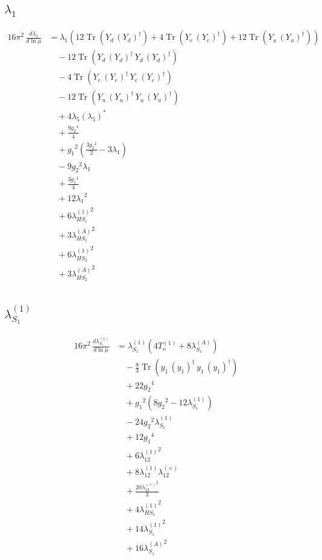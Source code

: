 \documentclass[10pt,a4paper]{article}
\begin{document}
\subsection*{$\lambda_1$}
\begin{align*}
16\pi^2\,\frac{d \lambda_1}{d\ln\mu} &={\lambda_1} (12 \operatorname{Tr}\!\left({Y_d}\,\left({Y_d}\right)^{\dagger}\right)+4 \operatorname{Tr}\!\left({Y_e}\,\left({Y_e}\right)^{\dagger}\right)+12 \operatorname{Tr}\!\left({Y_u}\,\left({Y_u}\right)^{\dagger}\right)) \\
&\quad -12 \operatorname{Tr}\!\left({Y_d}\,\left({Y_d}\right)^{\dagger}\,{Y_d}\,\left({Y_d}\right)^{\dagger}\right) \\
&\quad -4 \operatorname{Tr}\!\left({Y_e}\,\left({Y_e}\right)^{\dagger}\,{Y_e}\,\left({Y_e}\right)^{\dagger}\right) \\
&\quad -12 \operatorname{Tr}\!\left({Y_u}\,\left({Y_u}\right)^{\dagger}\,{Y_u}\,\left({Y_u}\right)^{\dagger}\right) \\
&\quad +4 {\lambda_5} \left({\lambda_5}\right)^{*} \\
&\quad +\frac{9 {g_2}^4}{4} \\
&\quad +{g_1}^2 \left(\frac{3 {g_2}^2}{2}-3 {\lambda_1}\right) \\
&\quad -9 {g_2}^2 {\lambda_1} \\
&\quad +\frac{3 {g_1}^4}{4} \\
&\quad +12 {\lambda_1}^2 \\
&\quad +6 {\lambda_{HS_1}^{(1)}}^2 \\
&\quad +3 {\lambda_{HS_1}^{(A)}}^2 \\
&\quad +6 {\lambda_{HS_2}^{(1)}}^2 \\
&\quad +3 {\lambda_{HS_2}^{(A)}}^2 \\
\end{align*}
\subsection*{$\lambda_{S_1}^{(1)}$}
\begin{align*}
16\pi^2\,\frac{d \lambda_{S_1}^{(1)}}{d\ln\mu} &={\lambda_{S_1}^{(1)}} (4 T_{\nu}^{(1)}+8 {\lambda_{S_1}^{(A)}}) \\
&\quad -\frac{8}{3} \operatorname{Tr}\!\left({y_1}\,\left({y_1}\right)^{\dagger}\,{y_1}\,\left({y_1}\right)^{\dagger}\right) \\
&\quad +22 {g_2}^4 \\
&\quad +{g_1}^2 \left(8 {g_2}^2-12 {\lambda_{S_1}^{(1)}}\right) \\
&\quad -24 {g_2}^2 {\lambda_{S_1}^{(1)}} \\
&\quad +12 {g_1}^4 \\
&\quad +6 {\lambda_{12}^{(1)}}^2 \\
&\quad +8 {\lambda_{12}^{(1)}} {\lambda_{12}^{(\times)}} \\
&\quad +\frac{20 {\lambda_{12}^{(\times)}}^2}{3} \\
&\quad +4 {\lambda_{HS_1}^{(1)}}^2 \\
&\quad +14 {\lambda_{S_1}^{(1)}}^2 \\
&\quad +16 {\lambda_{S_1}^{(A)}}^2 \\
\end{align*}
\end{document}
